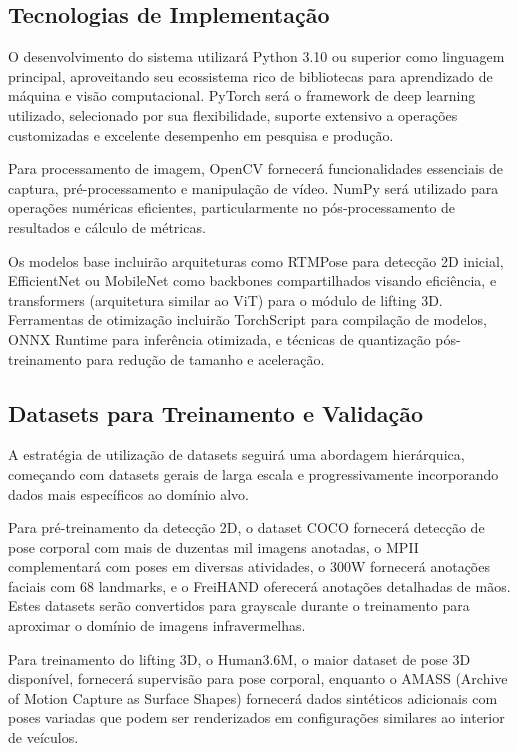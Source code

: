 \documentclass[12pt, a4paper]{article}
\begin{document}
\subsection{Tecnologias de Implementação}

O desenvolvimento do sistema utilizará Python 3.10 ou superior como linguagem principal, aproveitando seu ecossistema rico de bibliotecas para aprendizado de máquina e visão computacional. PyTorch será o framework de deep learning utilizado, selecionado por sua flexibilidade, suporte extensivo a operações customizadas e excelente desempenho em pesquisa e produção.

Para processamento de imagem, OpenCV fornecerá funcionalidades essenciais de captura, pré-processamento e manipulação de vídeo. NumPy será utilizado para operações numéricas eficientes, particularmente no pós-processamento de resultados e cálculo de métricas.

Os modelos base incluirão arquiteturas como RTMPose para detecção 2D inicial, EfficientNet ou MobileNet como backbones compartilhados visando eficiência, e transformers (arquitetura similar ao ViT) para o módulo de lifting 3D. Ferramentas de otimização incluirão TorchScript para compilação de modelos, ONNX Runtime para inferência otimizada, e técnicas de quantização pós-treinamento para redução de tamanho e aceleração.

\subsection{Datasets para Treinamento e Validação}

A estratégia de utilização de datasets seguirá uma abordagem hierárquica, começando com datasets gerais de larga escala e progressivamente incorporando dados mais específicos ao domínio alvo.

Para pré-treinamento da detecção 2D, o dataset COCO fornecerá detecção de pose corporal com mais de duzentas mil imagens anotadas, o MPII complementará com poses em diversas atividades, o 300W fornecerá anotações faciais com 68 landmarks, e o FreiHAND oferecerá anotações detalhadas de mãos. Estes datasets serão convertidos para grayscale durante o treinamento para aproximar o domínio de imagens infravermelhas.

Para treinamento do lifting 3D, o Human3.6M, o maior dataset de pose 3D disponível, fornecerá supervisão para pose corporal, enquanto o AMASS (Archive of Motion Capture as Surface Shapes) fornecerá dados sintéticos adicionais com poses variadas que podem ser renderizados em configurações similares ao interior de veículos.
\end{document}
